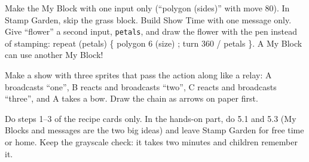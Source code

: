 \begin{differentiation}
\supportpath Make the My Block with one input only (\enquote{polygon (sides)} with move 80). In Stamp Garden, skip the grass block. Build Show Time with one message only.
\extensionpath Give \enquote{flower} a second input, \texttt{petals}, and draw the flower with the pen instead of stamping: repeat (petals) \{ polygon 6 (size) ; turn 360 / petals \}. A My Block can use another My Block!
\end{differentiation}

\begin{stretchchallenge}
Make a show with three sprites that pass the action along like a relay: A broadcasts \enquote{one}, B reacts and broadcasts \enquote{two}, C reacts and broadcasts \enquote{three}, and A takes a bow. Draw the chain as arrows on paper first.
\end{stretchchallenge}

\begin{teachernote}
Do steps 1--3 of the recipe cards only. In the hands-on part, do 5.1 and 5.3 (My Blocks and messages are the two big ideas) and leave Stamp Garden for free time or home. Keep the grayscale check: it takes two minutes and children remember it.
\end{teachernote}
